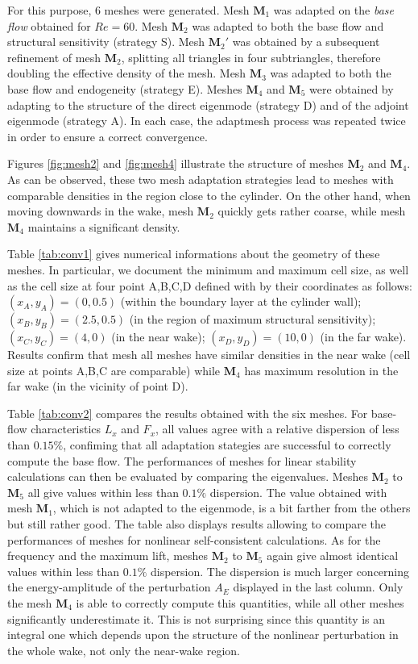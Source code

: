 \documentclass[twocolumn,10pt]{asme2ej}
\begin{document}
For this purpose, 6 meshes were generated. 
Mesh $\mathbf{M}_1$ was adapted on the {\em base flow} obtained for $Re=60$.
Mesh $\mathbf{M}_2$ was adapted to both the base flow and structural sensitivity (strategy S).
Mesh $\mathbf{M}_2'$ was obtained by a subsequent refinement of mesh $\mathbf{M}_2$, splitting all triangles in four subtriangles, therefore doubling the effective density of the mesh.
Mesh $\mathbf{M}_3$ was adapted to both the base flow and endogeneity (strategy E).
Meshes $\mathbf{M}_4$ and $\mathbf{M}_5$ were obtained by adapting to the structure of the direct eigenmode (strategy D) and of the adjoint eigenmode (strategy A). In each case, the adaptmesh process was repeated twice in order to ensure a correct convergence.

Figures \ref{fig:mesh2} and \ref{fig:mesh4} illustrate the structure of meshes $\mathbf{M}_2$ and $\mathbf{M}_4$. As can be observed, these two mesh adaptation strategies lead to meshes with comparable densities in the region close to the cylinder. On the other hand, when moving downwards in the wake, mesh $\mathbf{M}_2$ quickly gets rather coarse, while mesh $\mathbf{M}_4$ maintains a significant density.

Table \ref{tab:conv1} gives numerical informations about the geometry of these meshes. In particular, we document the minimum and maximum cell size, as well as the cell size at four point A,B,C,D defined with by their coordinates as follows: $(x_A,y_A) = (0,0.5)$ (within the boundary layer at the cylinder wall); $(x_B,y_B) = (2.5,0.5)$ (in the region of maximum structural sensitivity); $(x_C,y_C) = (4,0)$ (in the near wake); $(x_D,y_D) = (10,0)$ (in the far wake). Results confirm that mesh all meshes have similar densities in the near wake (cell size at points A,B,C are comparable) 
while $\mathbf{M}_4$ has maximum resolution in the far wake (in the vicinity of point D).

Table  \ref{tab:conv2} compares the results obtained with the six meshes. For base-flow characteristics $L_x$ and $F_x$, all values agree with a relative dispersion of less than $0.15\%$, confiming that all adaptation stategies are successful to correctly compute the base flow. 
The performances of meshes for linear stability calculations can then be evaluated by comparing the eigenvalues. Meshes $\mathbf{M}_2$ to $\mathbf{M}_5$ all give values within less than $0.1\%$ dispersion. The value obtained with mesh  $\mathbf{M}_1$, which is not adapted to the eigenmode, is a bit farther from the others but still rather good. The table also displays results allowing to compare the performances of meshes for nonlinear self-consistent calculations. As for the frequency and the maximum lift, meshes $\mathbf{M}_2$ to $\mathbf{M}_5$ again give almost identical values within less than $0.1\%$ dispersion. The dispersion is much larger concerning the energy-amplitude of the perturbation $A_E$ displayed in the last column. Only the mesh $\mathbf{M}_4$ is able to correctly compute this quantities, while all other meshes significantly underestimate it. This is not surprising since this quantity is an integral one which depends upon the structure of the nonlinear perturbation in the whole wake, not only the near-wake region.
\end{document}
